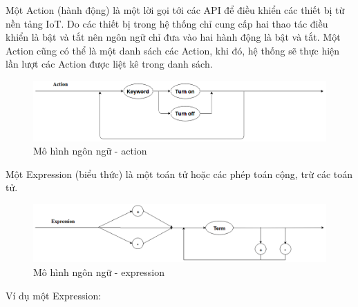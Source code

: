 Một Action (hành động) là một lời gọi tới các API để điều khiển các thiết bị từ nền tảng IoT. Do các thiết bị trong hệ thống chỉ cung cấp hai thao tác điều khiển là bật và tắt nên ngôn ngữ chỉ đưa vào hai hành động là bật và tắt. Một Action cũng có thể là một danh sách các Action, khi đó, hệ thống sẽ thực hiện lần lượt các Action được liệt kê trong danh sách.

\begin{figure}[h!]
	\center
	\includegraphics[scale=0.4]{image/language_model-action}
	\caption{Mô hình ngôn ngữ - action}
\end{figure}



Một Expression (biểu thức) là một toán tử hoặc các phép toán cộng, trừ các toán tử.
\begin{figure}[h!]
	\center
	\includegraphics[scale=0.4]{image/language_model-expression}
	\caption{Mô hình ngôn ngữ - expression}
\end{figure}

Ví dụ một Expression: \\


